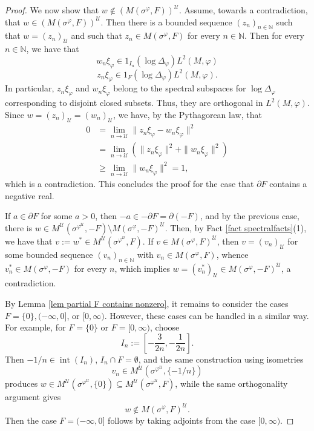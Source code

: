 \documentclass[12pt]{amsart}
\theoremstyle{definition}
\def\vp{\varphi}
\def\sg{\sigma}
\def\cal{\mathcal}
\def\u{\mathsf 1}
\newcommand\cU{{\cal U}}
\def \u{\mathcal U}
\begin{document}
\begin{proof}
We now show that $w\notin (M(\sigma^{\varphi},F))^{\cU}$. Assume, towards a contradiction, that  $w\in (M(\sigma^{\varphi},F))^{\cU}$. 
Then there is a bounded sequence $(z_n)_{n\in \mathbb{N}}$ such that $w=(z_n)_\u$ and such that $z_n\in M(\sigma^{\varphi},F)$ for every $n\in \mathbb{N}$. Then for every $n\in \mathbb{N}$, we have that
$$w_n \xi_\varphi \in 1_{I_n}(\log \Delta_{\varphi}) L^2(M, \varphi)$$
$$z_n \xi_\varphi \in 1_{F}(\log \Delta_{\varphi}) L^2(M, \varphi).$$
In particular, $z_n\xi_{\varphi}$ and $w_n\xi_{\varphi}$ belong to the spectral subspaces for $\log \Delta_{\varphi}$ corresponding to disjoint closed subsets. Thus, they are orthogonal in $L^2(M,\varphi)$. Since $w=(z_n)_{\cU}=(w_n)_{\cU}$, we have, by the Pythagorean law, that
\begin{align*}
0&=\lim_{n\to \cU}\|z_n\xi_{\varphi}-w_n\xi_{\varphi}\|^2\\
&=\lim_{n\to \cU}(\|z_n\xi_{\varphi}\|^2+\|w_n\xi_{\varphi}\|^2)\\
&\ge \lim_{n\to \cU}\|w_n\xi_{\varphi}\|^2=1,
\end{align*}
which is a contradiction. This concludes the proof for the case that $\partial F$ contains a negative real. 

If $a\in \partial F$ for some $a>0$, then $-a\in -\partial F=\partial (-F)$, and by the previous case, there is $w\in M^{\cU}(\sigma^{\varphi^{\cU}},-F)\setminus M(\sigma^{\varphi},-F)^{\cU}$. Then, by Fact \ref{fact spectralfacts}(1), we have that $v:=w^*\in M^{\cU}(\sigma^{\varphi^{\cU}},F)$. If $v\in M(\sigma^{\varphi},F)^{\cU}$, then $v=(v_n)_\u$ for some bounded sequence $(v_n)_{n\in \mathbb{N}}$ with $v_n\in M(\sigma^{\varphi},F)$, whence $v_n^*\in M(\sigma^{\varphi},-F)$ for every $n$, which implies $w=(v_n^*)_{\cU}\in M(\sigma^{\varphi},-F)^{\cU}$, a contradiction. 

By Lemma \ref{lem partial F contains nonzero}, it remains to consider the cases $F=\{0\}, (-\infty,0]$, or $[0,\infty)$.  However, these cases can be handled in a similar way.  
For example, for \(F=\{0\}\) or \(F=[0,\infty)\), choose
\[
 I_n:=\left[-\frac{3}{2n},-\frac{1}{2n}\right].
\]
Then \(-1/n\in \operatorname{int}(I_n)\), \(I_n\cap F=\emptyset\), and the same construction using isometries
\[
 v_n\in M^{\cU}(\sg^{\vp^{\cU}},\{-1/n\})
\]
produces \(w\in M^{\cU}(\sg^{\vp^{\cU}},\{0\})\subseteq M^{\cU}(\sg^{\vp^{\cU}},F)\), while the same orthogonality argument gives
\[
 w\notin M(\sg^\vp,F)^{\cU}.
\]
Then the case \(F=(-\infty,0]\) follows by taking adjoints from the case \([0,\infty)\).
\end{proof}
\end{document}
